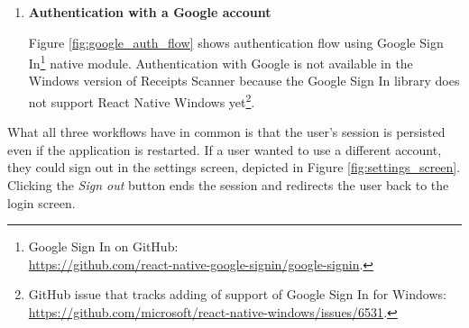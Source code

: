 \documentclass[
  printed, %
  table,   %
  oneside, %
  lof,     %
  lot,     %
]{fithesis3}
\begin{document}
\begin{enumerate}
    \item \textbf{Authentication with a Google account}
    
    \label{phantom:google_sign_in}
    Figure \ref{fig:google_auth_flow} shows authentication flow using Google Sign In\footnote{Google Sign In on GitHub:\\\url{https://github.com/react-native-google-signin/google-signin}.} native module.
    Authentication with Google is not available in the Windows version of Receipts Scanner because the Google Sign In library does not support React Native Windows yet\footnote{GitHub issue that tracks adding of support of Google Sign In for Windows: \url{https://github.com/microsoft/react-native-windows/issues/6531}.}.

\end{enumerate}

What all three workflows have in common is that the user's session is persisted even if the application is restarted.
If a user wanted to use a different account, they could sign out in the settings screen, depicted in Figure \ref{fig:settings_screen}. Clicking the \textit{Sign out} button ends the session and redirects the user back to the login screen.
\end{document}
